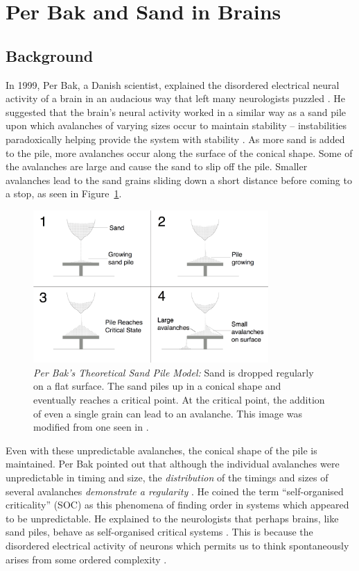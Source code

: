 \documentclass{book}
\begin{document}
\section{Per Bak and Sand in Brains}
\subsection{Background}
In 1999, Per Bak, a Danish scientist, explained the disordered electrical neural activity of a brain in an audacious way that left many neurologists puzzled \cite{MindSandWeb}.  He suggested that the brain's neural activity worked in a similar way as a sand pile upon which avalanches of varying sizes occur to maintain stability -- instabilities paradoxically helping provide the system with stability \cite{MindSandWeb}. As more sand is added to the pile, more avalanches occur along the surface of the conical shape. Some of the avalanches are large and cause the sand to slip off the pile. Smaller avalanches lead to the sand grains sliding down a short distance before coming to a stop, as seen in Figure~\ref{fig:sandPileModel}. 

	\begin{figure}[h]
	\centering
	\includegraphics[width=0.8\textwidth]{Figures/Intro/SandPileFigs/sand_pile_model.png}
	\caption[Per Bak's Theoretical Sand Pile Model]{
		\textit{Per Bak's Theoretical Sand Pile Model:} Sand is dropped regularly on a flat surface. The sand piles up in a conical shape and eventually reaches a critical point. At the critical point, the addition of even a single grain can lead to an avalanche. This image was modified from one seen in \cite{IMGSandPile}.}
	\label{fig:sandPileModel}
\end{figure}

Even with these unpredictable avalanches, the conical shape of the pile is maintained. Per Bak pointed out that although the individual avalanches were unpredictable in timing and size, the \textit{distribution} of the timings and sizes of several avalanches \textit{demonstrate a regularity} \cite{OGperBak1987}. He coined the term ``self-organised criticality'' (SOC) as this phenomena of finding order in systems which appeared to be unpredictable.  He explained to the neurologists that perhaps brains, like sand piles, behave as self-organised critical systems \cite{MindSandWeb}. This is because the disordered electrical activity of neurons which permits us to think spontaneously arises from some ordered complexity \cite{MindSandWeb}. 
\end{document}
